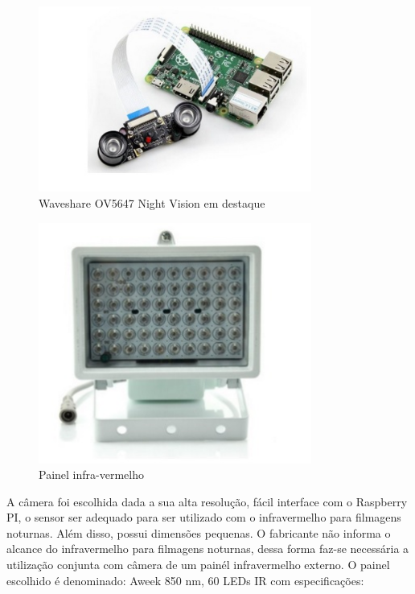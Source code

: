 \begin{figure}[H]
  \centering
  \includegraphics[width=0.8\textwidth]{figuras/RSP}
  \caption[Waveshare OV5647 Night Vision em destaque]{Waveshare OV5647 Night Vision em destaque~\cite{amazon1}}
  \label{img:Waveshare}
\end{figure}

\begin{figure}[H]
  \centering
  \includegraphics[width=0.8\textwidth]{figuras/Painel}
  \caption[Painel infra-vermelho]{Painel infra-vermelho~\cite{amazon2}}
  \label{img:painel}
\end{figure}

A câmera foi escolhida dada a sua alta resolução, fácil interface com o Raspberry PI, o sensor ser adequado para ser utilizado com o infravermelho para filmagens noturnas. Além disso, possui dimensões pequenas. O fabricante não informa o alcance do infravermelho para filmagens noturnas, dessa forma faz-se necessária a utilização conjunta com  câmera de um painél infravermelho externo. O painel escolhido é denominado: Aweek 850 nm, 60 LEDs IR com especificações:

